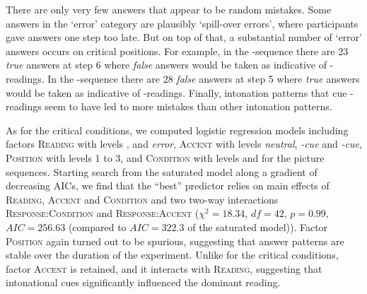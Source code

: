 \documentclass[fleqn,reqno,10pt,draft]{article}
\newcommand{\lc}{\acro{lc}}
\newcommand{\ec}{\acro{ec}}
\begin{document}



There are only very few answers that appear to be random
mistakes. Some answers in the `error' category are plausibly
`spill-over errors', where participants gave answers one step too
late. But on top of that, a substantial number of `error' answers
occurs on critical positions. For example, in the \lc-sequence there
are 23 \emph{true} answers at step 6 where \emph{false} answers would
be taken as indicative of \ec-readings. In the \ec-sequence there are
28 \emph{false} answers at step 5 where \emph{true} answers would be
taken as indicative of \lc-readings.%
Finally, intonation patterns
that cue \ec-readings seem to have led to more mistakes than other
intonation patterns.

As for the critical conditions, we computed logistic regression models
including factors \textsc{Reading} with levels \lc, \ec and
\emph{error}, \textsc{Accent} with levels \emph{neutral},
\emph{\lc-cue} and \emph{\ec-cue}, \textsc{Position} with levels 1 to
3, and \textsc{Condition} with levels \lc and \ec for the picture
sequences. Starting search from the saturated model along a gradient
of decreasing AICs, we find that the ``best'' predictor relies on main
effects of \textsc{Reading}, \textsc{Accent} and \textsc{Condition}
and two two-way interactions \textsc{Response:Condition} and
\textsc{Response:Accent} ($\chi^2=18.34$, $df=42$, $p=0.99$,
$AIC=256.63$ (compared to $AIC=322.3$ of the saturated model)). Factor
\textsc{Position} again turned out to be spurious, suggesting that
answer patterns are stable over the duration of the experiment. Unlike
for the critical conditions, factor \textsc{Accent} is retained, and
it interacts with \textsc{Reading}, suggesting that intonational cues
significantly influenced the dominant reading.
\end{document}
